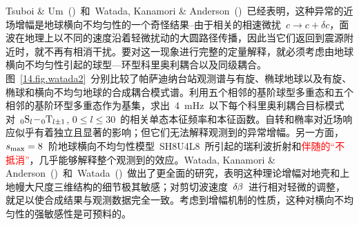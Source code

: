 Tsuboi \& Um~(\citeyear{tsuboi&um93})~和~Watada, Kanamori \& Anderson~(\citeyear{watada&al93})~已经表明，这种异常的近场增幅是地球横向不均匀性的一个奇怪结果--由于相关的相速微扰~$c\rightarrow c+\delta c$，面波在地理上以不同的速度沿着轻微扰动的大圆路径传播，因此当它们返回到震源附近时，就不再有相消干扰。要对这一现象进行完整的定量解释，就必须考虑由地球横向不均匀性引起的球型—环型科里奥利耦合以及同级耦合。图~\ref{14.fig.watada2}~分别比较了帕萨迪纳台站观测谱与有旋、椭球地球以及有旋、椭球和横向不均匀地球的合成耦合模式谱。利用五个相邻的基阶球型多重态和五个相邻的基阶环型多重态作为基集，求出~4~mHz~以下每个科里奥利耦合目标模式对~${}_0{\rm S}_l\!-\!{}_0{\rm T}_{l\pm1}$, $0\leq l\leq 30$~的相关单态本征频率和本征函数。自转和椭率对近场响应似乎有着独立且显著的影响；但它们无法解释观测到的异常增幅。另一方面，$s_{\rm max}=8$~阶地球横向不均匀性模型~SH8U4L8~所引起的瑞利波折射和\textcolor{red}{伴随的“不抵消”}，几乎能够解释整个观测到的效应。Watada, Kanamori \& Anderson~(\citeyear{watada&al93})~和~Watada~(\citeyear{watada95})~做出了更全面的研究，表明这种理论增幅对地壳和上地幔大尺度三维结构的细节极其敏感；对剪切波速度~$\delta\hspace{-0.2 mm}\beta$~进行相对轻微的调整，就足以使合成结果与观测数据完全一致。考虑到增幅机制的性质，这种对横向不均匀性的强敏感性是可预料的。
